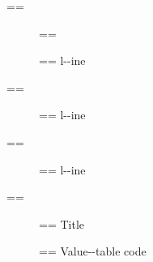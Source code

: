 \documentclass{book}
\makeatletter
\newenvironment{GNUTexinfopreformatted}{%
  \par\GNUTobeylines\obeyspaces\frenchspacing
  \parskip=\z@\parindent=\z@}{}
{\catcode`\^^M=13 \gdef\GNUTobeylines{\catcode`\^^M=13 \def^^M{\null\par}}}
\newenvironment{GNUTexinfoindented}
  {\begin{list}{}{}
  \item\relax}
  {\end{list}}
\makeatother
\begin{document}
\begin{GNUTexinfoindented}
\begin{GNUTexinfopreformatted}
\end{GNUTexinfopreformatted}
\begin{description}
\item[] \begin{GNUTexinfopreformatted}%
\ttfamily \end{GNUTexinfopreformatted}
\item[{\parbox[b]{\linewidth}{%
\textbf{a--strong}}}]
\begin{GNUTexinfopreformatted}%
\ttfamily l{-}{-}ine
\end{GNUTexinfopreformatted}
\end{description}
\begin{GNUTexinfopreformatted}%
\ttfamily 
\end{GNUTexinfopreformatted}
\begin{description}
\item[{\parbox[b]{\linewidth}{%
a--asis\\
\index[cp]{a--asis@\texttt{a{-}{-}asis}}%
b
\index[cp]{b@\texttt{b}}%
}}]
\begin{GNUTexinfopreformatted}%
\ttfamily l{-}{-}ine
\end{GNUTexinfopreformatted}
\end{description}
\begin{GNUTexinfopreformatted}%
\ttfamily 
\end{GNUTexinfopreformatted}
\begin{description}
\item[{\parbox[b]{\linewidth}{%
\emph{a}\\
\index[fn]{a@\texttt{a}}%
\index[cp]{index entry between item and itemx}%
\emph{b}
\index[fn]{b@\texttt{b}}%
}}]
\begin{GNUTexinfopreformatted}%
\ttfamily l{-}{-}ine
\end{GNUTexinfopreformatted}
\end{description}
\begin{GNUTexinfopreformatted}%
\ttfamily 
\end{GNUTexinfopreformatted}
\begin{description}
\item[] \begin{GNUTexinfopreformatted}%
\ttfamily Title
\end{GNUTexinfopreformatted}
\item[{\parbox[b]{\linewidth}{%
\texttt{a{-}{-}code}}}]
\begin{GNUTexinfopreformatted}%
\ttfamily Value{-}{-}table code
\end{GNUTexinfopreformatted}

\end{description}
\end{GNUTexinfoindented}
\end{document}
